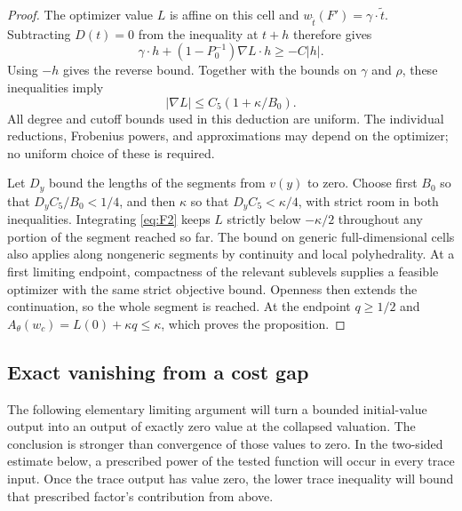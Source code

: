 \begin{proof}
The optimizer value $L$ is affine on this cell and
$w_{\widetilde t}(F')=\gamma\cdot\widetilde t$.  Subtracting
$D(t)=0$ from the inequality at $t+h$ therefore gives
\[
       \gamma\cdot h+(1-P_0^{-1})\nabla L\cdot h\ge-C|h|.
\]
Using $-h$ gives the reverse bound.  Together with the bounds on
$\gamma$ and $\rho$, these inequalities imply
\begin{equation}\label{eq:F2}
                     |\nabla L|\le C_5(1+\kappa/B_0).
\end{equation}
All degree and cutoff bounds used in this deduction are uniform.
The individual reductions, Frobenius powers, and approximations may
depend on the optimizer; no uniform choice of these is required.

Let $D_y$ bound the lengths of the segments from $v(y)$ to zero.
Choose first $B_0$ so that $D_yC_5/B_0<1/4$, and then $\kappa$
so that $D_yC_5<\kappa/4$, with strict room in both inequalities.
Integrating \eqref{eq:F2} keeps $L$ strictly below $-\kappa/2$
throughout any portion of the segment reached so far.  The bound
on generic full-dimensional cells also applies along nongeneric
segments by continuity and local polyhedrality.  At a first limiting
endpoint, compactness of the relevant sublevels supplies a feasible
optimizer with the same strict objective bound.  Openness then extends the
continuation, so the whole segment is reached.  At the endpoint $q\ge1/2$ and
$A_\theta(w_c)=L(0)+\kappa q\le\kappa$, which proves the
proposition.
\end{proof}

\subsection{Exact vanishing from a cost gap}

The following elementary limiting argument will turn a bounded
initial-value output into an output of exactly zero value at the
collapsed valuation.  The conclusion is stronger than convergence
of those values to zero.
In the two-sided estimate below, a prescribed power of the tested
function will occur in every trace input.  Once the trace output has
value zero, the lower trace inequality will bound that prescribed
factor's contribution from above.

